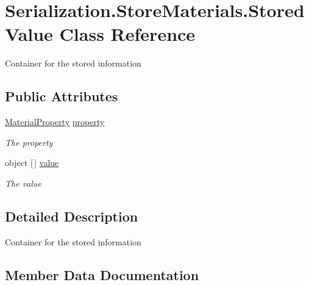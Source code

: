 \hypertarget{class_serialization_1_1_store_materials_1_1_stored_value}{}\section{Serialization.\+Store\+Materials.\+Stored\+Value Class Reference}
\label{class_serialization_1_1_store_materials_1_1_stored_value}


Container for the stored information  


\subsection*{Public Attributes}
\begin{DoxyCompactItemize}
\item 
\hyperlink{class_serialization_1_1_store_materials_1_1_material_property}{Material\+Property} \hyperlink{class_serialization_1_1_store_materials_1_1_stored_value_a951e8e6f48c967b8a01c644827d3be38}{property}
\begin{DoxyCompactList}\small\item\em The property \end{DoxyCompactList}\item 
object \mbox{[}$\,$\mbox{]} \hyperlink{class_serialization_1_1_store_materials_1_1_stored_value_aa483eb4367f2294ab1d112f00e26032a}{value}
\begin{DoxyCompactList}\small\item\em The value \end{DoxyCompactList}\end{DoxyCompactItemize}


\subsection{Detailed Description}
Container for the stored information 



\subsection{Member Data Documentation}
\mbox{\label{class_serialization_1_1_store_materials_1_1_stored_value_a951e8e6f48c967b8a01c644827d3be38}} 

